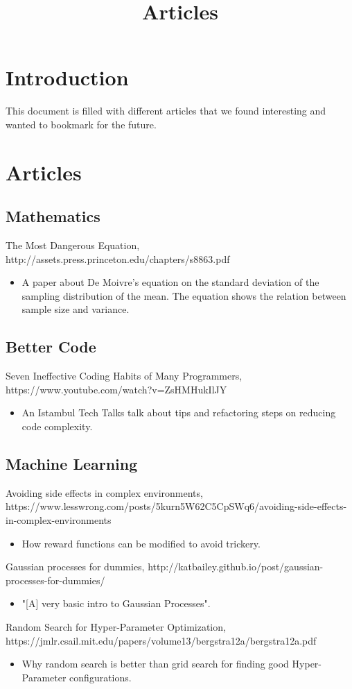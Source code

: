 \documentclass{article}
\title{Articles}
\begin{document}
\maketitle

\section{Introduction}
This document is filled with different articles that we found interesting and wanted to bookmark for the future.

\section{Articles}
\subsection{Mathematics}
The Most Dangerous Equation, http://assets.press.princeton.edu/chapters/s8863.pdf
\begin{itemize}
    \item A paper about De Moivre's equation on the standard deviation of the sampling distribution of the mean. 
  The equation shows the relation between sample size and variance.
\end{itemize}


\subsection{Better Code}
Seven Ineffective Coding Habits of Many Programmers, https://www.youtube.com/watch?v=ZsHMHukIlJY
\begin{itemize}
    \item An Istambul Tech Talks talk about tips and refactoring steps on reducing code complexity.
\end{itemize}


\subsection{Machine Learning}
Avoiding side effects in complex environments, https://www.lesswrong.com/posts/5kurn5W62C5CpSWq6/avoiding-side-effects-in-complex-environments
\begin{itemize}
\item How reward functions can be modified to avoid trickery.
\end{itemize}  
Gaussian processes for dummies, http://katbailey.github.io/post/gaussian-processes-for-dummies/
\begin{itemize}
\item "[A] very basic intro to Gaussian Processes".
\end{itemize} 
Random Search for Hyper-Parameter Optimization, https://jmlr.csail.mit.edu/papers/volume13/bergstra12a/bergstra12a.pdf
\begin{itemize}
\item Why random search is better than grid search for finding good Hyper-Parameter configurations.
\end{itemize} 
\end{document}
